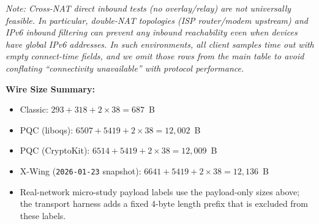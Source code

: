 \documentclass[10pt,journal,compsoc]{IEEEtran}
\newcommand{\artifactdateXWing}{2026-01-23}
\begin{document}






\noindent\textit{Note: Cross-NAT direct inbound tests (no overlay/relay) are not universally feasible. In particular, double-NAT topologies (ISP router/modem upstream) and IPv6 inbound filtering can prevent any inbound reachability even when devices have global IPv6 addresses. In such environments, all client samples time out with empty connect-time fields, and we omit those rows from the main table to avoid conflating ``connectivity unavailable'' with protocol performance.}

\textbf{Wire Size Summary:}
\begin{itemize}
\item Classic: $293 + 318 + 2 \times 38 = 687$~B
\item PQC (liboqs): $6507 + 5419 + 2 \times 38 = 12{,}002$~B
\item PQC (CryptoKit): $6514 + 5419 + 2 \times 38 = 12{,}009$~B
\item X-Wing (\texttt{\artifactdateXWing} snapshot): $6641 + 5419 + 2 \times 38 = 12{,}136$~B
\item Real-network micro-study payload labels use the payload-only sizes above; the transport harness adds a fixed 4-byte length prefix that is excluded from these labels.
\end{itemize}
\end{document}
